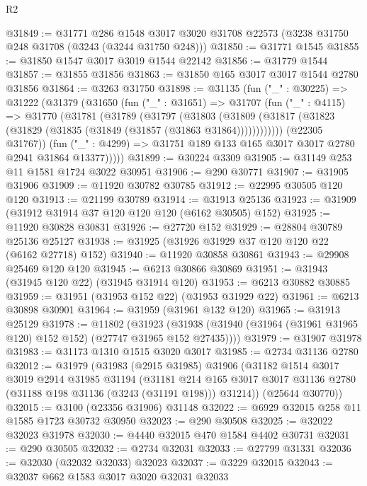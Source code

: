 \begin{lexlean}{R2}
\begin{coremodule}
@31849 := @31771
    @286
    @1548
    @3017
    @3020
    @31708
    @22573
    (@3238 @31750 @248 @31708 (@3243 (@3244 @31750 @248)))
@31850 := @31771 @1545
@31855 := @31850 @1547 @3017 @3019 @1544 @22142
@31856 := @31779 @1544
@31857 := @31855 @31856
@31863 := @31850 @165 @3017 @3017 @1544 @2780 @31856
@31864 := @3263 @31750
@31898 := @31135
    (fun ("_" : @30225) =>
    @31222
      (@31379
        (@31650
          (fun ("_" : @31651) =>
          @31707
            (fun ("_" : @4115) =>
            @31770
              (@31781
                (@31789
                  (@31797
                    (@31803
                      (@31809
                        (@31817 (@31823 (@31829 (@31835 (@31849 (@31857 (@31863 @31864))))))))))))
              (@22305 @31767))
            (fun ("_" : @4299) => @31751 @189 @133 @165 @3017 @3017 @2780 @2941 @31864 @13377)))))
@31899 := @30224 @3309
@31905 := @31149 @253 @11 @1581 @1724 @3022 @30951
@31906 := @290 @30771
@31907 := @31905 @31906
@31909 := @11920 @30782 @30785
@31912 := @22995 @30505 @120 @120
@31913 := @21199 @30789
@31914 := @31913 @25136
@31923 := @31909 (@31912 @31914 @37 @120 @120 @120 (@6162 @30505) @152)
@31925 := @11920 @30828 @30831
@31926 := @27720 @152
@31929 := @28804 @30789 @25136 @25127
@31938 := @31925 (@31926 @31929 @37 @120 @120 @22 (@6162 @27718) @152)
@31940 := @11920 @30858 @30861
@31943 := @29908 @25469 @120 @120
@31945 := @6213 @30866 @30869
@31951 := @31943 (@31945 @120 @22) (@31945 @31914 @120)
@31953 := @6213 @30882 @30885
@31959 := @31951 (@31953 @152 @22) (@31953 @31929 @22)
@31961 := @6213 @30898 @30901
@31964 := @31959 (@31961 @132 @120)
@31965 := @31913 @25129
@31978 := @11802
    (@31923 (@31938 (@31940 (@31964 (@31961 @31965 @120) @152 @152) (@27747 @31965 @152 @27435))))
@31979 := @31907 @31978
@31983 := @31173 @1310 @1515 @3020 @3017
@31985 := @2734 @31136 @2780
@32012 := @31979
    (@31983
      (@2915 @31985)
      @31906
      (@31182
        @1514
        @3017
        @3019
        @2914
        @31985
        @31194
        (@31181
          @214
          @165
          @3017
          @3017
          @31136
          @2780
          (@31188 @198 @31136 (@3243 (@31191 @198)))
          @31214))
      (@25644 @30770))
@32015 := @3100 (@23356 @31906) @31148
@32022 := @6929 @32015 @258 @11 @1585 @1723 @30732 @30950
@32023 := @290 @30508
@32025 := @32022 @32023 @31978
@32030 := @4440 @32015 @470 @1584 @4402 @30731
@32031 := @290 @30505
@32032 := @2734 @32031
@32033 := @27799 @31331
@32036 := @32030 (@32032 @32033) @32023
@32037 := @3229 @32015
@32043 := @32037 @662 @1583 @3017 @3020 @32031 @32033

\end{coremodule}
\end{lexlean}
